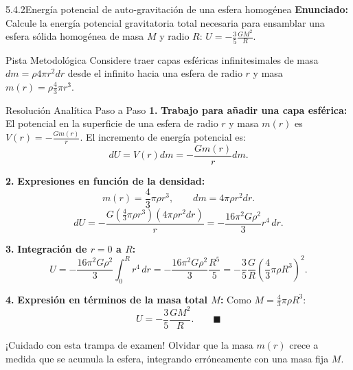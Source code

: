 \documentclass[11pt,a4paper]{article}
\begin{document}
\begin{nivelbox}{5.4.2}{Energía potencial de auto-gravitación de una esfera homogénea}
\textbf{Enunciado:}\\
Calcule la energía potencial gravitatoria total necesaria para ensamblar una esfera sólida homogénea de masa $M$ y radio $R$: $U = -\frac{3}{5} \frac{G M^2}{R}$.

\begin{observacionbox}{Pista Metodológica}
Considere traer capas esféricas infinitesimales de masa $dm = \rho 4\pi r^2 dr$ desde el infinito hacia una esfera de radio $r$ y masa $m(r) = \rho \frac{4}{3}\pi r^3$.
\end{observacionbox}

\begin{ejerciciobox}{Resolución Analítica Paso a Paso}
\smallskip\noindent\textbf{1.} \textbf{Trabajo para añadir una capa esférica:}
El potencial en la superficie de una esfera de radio $r$ y masa $m(r)$ es $V(r) = -\frac{G m(r)}{r}$.
El incremento de energía potencial es:
\[dU = V(r) dm = -\frac{G m(r)}{r} dm.\]

\smallskip\noindent\textbf{2.} \textbf{Expresiones en función de la densidad:}
\[m(r) = \frac{4}{3} \pi \rho r^3, \qquad dm = 4\pi \rho r^2 dr.\]
\[dU = -\frac{G (\frac{4}{3}\pi\rho r^3)(4\pi\rho r^2 dr)}{r} = -\frac{16\pi^2 G \rho^2}{3} r^4 \, dr.\]

\smallskip\noindent\textbf{3.} \textbf{Integración de $r = 0$ a $R$:}
\[U = -\frac{16\pi^2 G \rho^2}{3} \int_0^R r^4 \, dr = -\frac{16\pi^2 G \rho^2}{3} \frac{R^5}{5} = -\frac{3}{5} \frac{G}{R} \left( \frac{4}{3} \pi \rho R^3 \right)^2.\]

\smallskip\noindent\textbf{4.} \textbf{Expresión en términos de la masa total $M$:}
Como $M = \frac{4}{3}\pi\rho R^3$:
\[U = -\frac{3}{5} \frac{G M^2}{R}. \qquad \blacksquare\]
\end{ejerciciobox}

\begin{errorbox}{¡Cuidado con esta trampa de examen!}
Olvidar que la masa $m(r)$ crece a medida que se acumula la esfera, integrando erróneamente con una masa fija $M$.
\end{errorbox}
\end{nivelbox}
\bigskip
\end{document}
